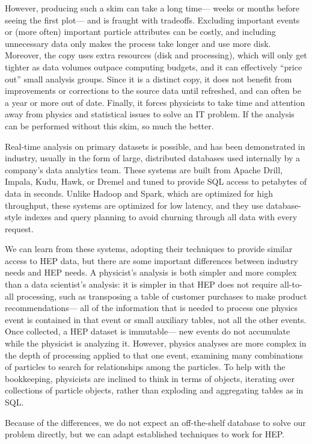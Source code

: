 \documentclass[a4paper]{jpconf}
\begin{document}
However, producing such a skim can take a long time--- weeks or months before seeing the first plot--- and is fraught with tradeoffs. Excluding important events or (more often) important particle attributes can be costly, and including unnecessary data only makes the process take longer and use more disk. Moreover, the copy uses extra resources (disk and processing), which will only get tighter as data volumes outpace computing budgets, and it can effectively ``price out'' small analysis groups. Since it is a distinct copy, it does not benefit from improvements or corrections to the source data until refreshed, and can often be a year or more out of date. Finally, it forces physicists to take time and attention away from physics and statistical issues to solve an IT problem. If the analysis can be performed without this skim, so much the better.

Real-time analysis on primary datasets is possible, and has been demonstrated in industry, usually in the form of large, distributed databases used internally by a company's data analytics team. These systems are built from Apache Drill, Impala, Kudu, Hawk, or Dremel and tuned to provide SQL access to petabytes of data in seconds. Unlike Hadoop and Spark, which are optimized for high throughput, these systems are optimized for low latency, and they use database-style indexes and query planning to avoid churning through all data with every request.

We can learn from these systems, adopting their techniques to provide similar access to HEP data, but there are some important differences between industry needs and HEP needs. A physicist's analysis is both simpler and more complex than a data scientist's analysis: it is simpler in that HEP does not require all-to-all processing, such as transposing a table of customer purchases to make product recommendations--- all of the information that is needed to process one physics event is contained in that event or small auxiliary tables, not all the other events. Once collected, a HEP dataset is immutable--- new events do not accumulate while the physicist is analyzing it. However, physics analyses are more complex in the depth of processing applied to that one event, examining many combinations of particles to search for relationships among the particles. To help with the bookkeeping, physicists are inclined to think in terms of objects, iterating over collections of particle objects, rather than exploding and aggregating tables as in SQL.

Because of the differences, we do not expect an off-the-shelf database to solve our problem directly, but we can adapt established techniques to work for HEP.
\end{document}
